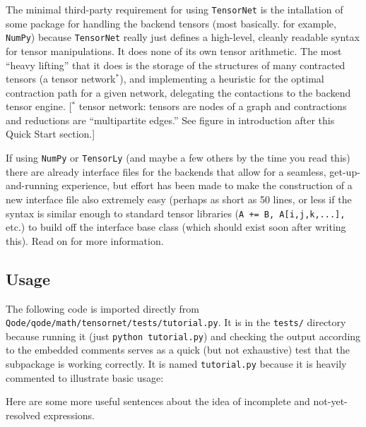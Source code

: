 \documentclass[12pt,letterpaper]{article}
\begin{document}
The minimal third-party requirement for using \texttt{TensorNet} is the intallation
 of some package for handling the backend tensors (most basically. for example, \texttt{NumPy})
 because \texttt{TensorNet} really just defines a high-level, cleanly readable syntax
 for tensor manipulations.
It does none of its own tensor arithmetic.
The most ``heavy lifting'' that it does is the storage of the structures of many
 contracted tensors (a tensor network$^*$), and implementing a heuristic for the optimal contraction
 path for a given network, delegating the contactions to the backend tensor engine.
[$^*$ tensor network: tensors are nodes of a graph and contractions and reductions are ``multipartite edges.''
 See figure in introduction after this Quick Start section.]

If using \texttt{NumPy} or \texttt{TensorLy} (and maybe a few others by the time you read this)
 there are already interface files for the backends that allow for a seamless,
 get-up-and-running experience, but effort has been made to make the construction of a new
 interface file also extremely easy (perhaps as short as 50 lines, or less if the syntax
 is similar enough to standard tensor libraries
 (\texttt{A += B, A[i,j,k,...],} etc.)
 to build off the
 interface base class (which should exist soon after writing this).
Read on for more information.

	\subsection{Usage}

The following code is imported directly from \texttt{Qode/qode/math/tensornet/tests/tutorial.py}.
It is in the \texttt{tests/} directory because running it (just \texttt{python tutorial.py}) and checking the output
 according to the embedded comments serves as a quick (but not exhaustive) test
 that the subpackage is working correctly.
It is named \texttt{tutorial.py} because it is heavily commented to illustrate
 basic usage:



Here are some more useful sentences about the idea of incomplete and not-yet-resolved
expressions.
\end{document}

